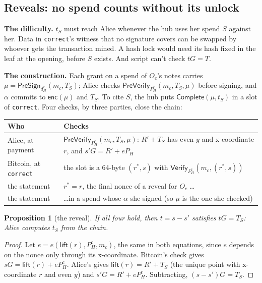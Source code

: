 \documentclass[11pt]{article}
\theoremstyle{plain}
\newtheorem{proposition}{Proposition}
\theoremstyle{definition}
\newcommand{\tx}[1]{\texttt{#1}}
\newcommand{\Vfy}{\mathsf{Verify}}
\newcommand{\PSign}{\mathsf{PreSign}}
\newcommand{\PVfy}{\mathsf{PreVerify}}
\newcommand{\Compl}{\mathsf{Complete}}
\newcommand{\enc}{\mathsf{enc}}
\newcommand{\PH}{P_H^{c}}
\newcommand{\dH}{d_H^{c}}
\newcommand{\Oc}{O_c}
\begin{document}
\subsection{Reveals: no spend counts without its unlock}\label{sec:reveal}

\textbf{The difficulty.} $t_S$ must reach Alice whenever the hub uses
her spend $S$ against her. Data in \tx{correct}'s witness that no
signature covers can be swapped by whoever gets the transaction mined.
A hash lock would need its hash fixed in the leaf at the opening, before
$S$ exists. And script can't check $tG = T$.

\textbf{The construction.} Each grant on a spend of $\Oc$'s notes
carries $\mu = \PSign_{\dH}(m_c, T_S)$; Alice checks $\PVfy_{\PH}(m_c,
T_S, \mu)$ before signing, and $\alpha$ commits to $\enc(\mu)$ and
$T_S$. To cite $S$, the hub puts $\Compl(\mu, t_S)$ in a slot of
\tx{correct}. Four checks, by three parties, close the chain:

\begin{center}
\begin{tabularx}{\linewidth}{lL}
\toprule
Who & Checks \\
\midrule
Alice, at payment & $\PVfy_{\PH}(m_c, T_S, \mu)$: $R' + T_S$ has even $y$ and x-coordinate $r$, and $s'G = R' + eP_H$ \\
Bitcoin, at \tx{correct} & the slot is a 64-byte $(r^\ast, s)$ with $\Vfy_{\PH}(m_c, (r^\ast, s))$ \\
the statement & $r^\ast = r$, the final nonce of a reveal for $\Oc$ \ldots \\
the statement & \ldots in a spend whose $\alpha$ she signed (so $\mu$ is the one she checked) \\
\bottomrule
\end{tabularx}
\end{center}

\begin{proposition}[the reveal]\label{prop:reveal}
If all four hold, then $t = s - s'$ satisfies $tG = T_S$: Alice computes
$t_S$ from the chain.
\end{proposition}
\begin{proof}
Let $e = e(\mathsf{lift}(r), \PH, m_c)$, the same in both equations,
since $e$ depends on the nonce only through its x-coordinate. Bitcoin's
check gives $sG = \mathsf{lift}(r) + e\PH$. Alice's gives
$\mathsf{lift}(r) = R' + T_S$ (the unique point with x-coordinate $r$
and even $y$) and $s'G = R' + e\PH$. Subtracting, $(s - s')G = T_S$.
\end{proof}
\end{document}
